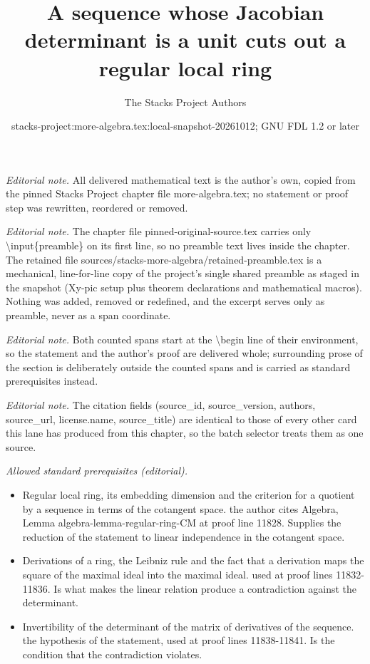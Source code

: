 \documentclass[10pt,a4paper]{amsart}
\title{A sequence whose Jacobian determinant is a unit cuts out a regular local ring}
\author{The Stacks Project Authors}
\date{stacks-project:more-algebra.tex:local-snapshot-20261012; GNU FDL 1.2 or later}
\theoremstyle{plain}
\theoremstyle{definition}
\theoremstyle{remark}
\numberwithin{equation}{subsection}
\begin{document}
\maketitle
\setcounter{subsection}{1}
\noindent\textit{Editorial note.} All delivered mathematical text is the author's own, copied from the pinned Stacks Project chapter file more-algebra.tex; no statement or proof step was rewritten, reordered or removed.\par\medskip
\noindent\textit{Editorial note.} The chapter file pinned-original-source.tex carries only \textbackslash{}input\{preamble\} on its first line, so no preamble text lives inside the chapter. The retained file sources/stacks-more-algebra/retained-preamble.tex is a mechanical, line-for-line copy of the project's single shared preamble as staged in the snapshot (Xy-pic setup plus theorem declarations and mathematical macros). Nothing was added, removed or redefined, and the excerpt serves only as preamble, never as a span coordinate.\par\medskip
\noindent\textit{Editorial note.} Both counted spans start at the \textbackslash{}begin line of their environment, so the statement and the author's proof are delivered whole; surrounding prose of the section is deliberately outside the counted spans and is carried as standard prerequisites instead.\par\medskip
\noindent\textit{Editorial note.} The citation fields (source\_id, source\_version, authors, source\_url, license.name, source\_title) are identical to those of every other card this lane has produced from this chapter, so the batch selector treats them as one source.\par\medskip
\noindent\textit{Allowed standard prerequisites (editorial).}\begin{itemize}
\item Regular local ring, its embedding dimension and the criterion for a quotient by a sequence in terms of the cotangent space. the author cites Algebra, Lemma algebra-lemma-regular-ring-CM at proof line 11828. Supplies the reduction of the statement to linear independence in the cotangent space.
\item Derivations of a ring, the Leibniz rule and the fact that a derivation maps the square of the maximal ideal into the maximal ideal. used at proof lines 11832-11836. Is what makes the linear relation produce a contradiction against the determinant.
\item Invertibility of the determinant of the matrix of derivatives of the sequence. the hypothesis of the statement, used at proof lines 11838-11841. Is the condition that the contradiction violates.
\end{itemize}\medskip
\end{document}
